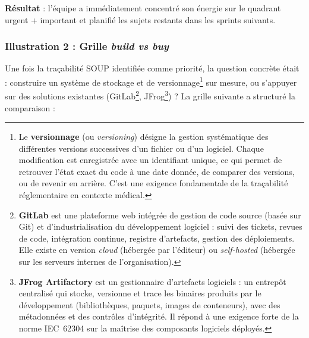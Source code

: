 \textbf{Résultat} : l'équipe a immédiatement concentré son énergie sur le quadrant urgent + important et planifié les sujets restants dans les sprints suivants.

\subsubsection{Illustration 2 : Grille \textit{build vs buy}}

Une fois la traçabilité SOUP identifiée comme priorité, la question concrète était : construire un système de stockage et de versionnage\footnote{Le \textbf{versionnage} (ou \emph{versioning}) désigne la gestion systématique des différentes versions successives d'un fichier ou d'un logiciel. Chaque modification est enregistrée avec un identifiant unique, ce qui permet de retrouver l'état exact du code à une date donnée, de comparer des versions, ou de revenir en arrière. C'est une exigence fondamentale de la traçabilité réglementaire en contexte médical.\label{fn:versionnage}} sur mesure, ou s'appuyer sur des solutions existantes (GitLab\footnote{\textbf{GitLab} est une plateforme web intégrée de gestion de code source (basée sur Git) et d'industrialisation du développement logiciel : suivi des tickets, revues de code, intégration continue, registre d'artefacts, gestion des déploiements. Elle existe en version \emph{cloud} (hébergée par l'éditeur) ou \emph{self-hosted} (hébergée sur les serveurs internes de l'organisation).\label{fn:gitlab}}, JFrog\footnote{\textbf{JFrog Artifactory} est un gestionnaire d'artefacts logiciels : un entrepôt centralisé qui stocke, versionne et trace les binaires produits par le développement (bibliothèques, paquets, images de conteneurs), avec des métadonnées et des contrôles d'intégrité. Il répond à une exigence forte de la norme IEC~62304 sur la maîtrise des composants logiciels déployés.\label{fn:jfrog}}) ? La grille suivante a structuré la comparaison :

